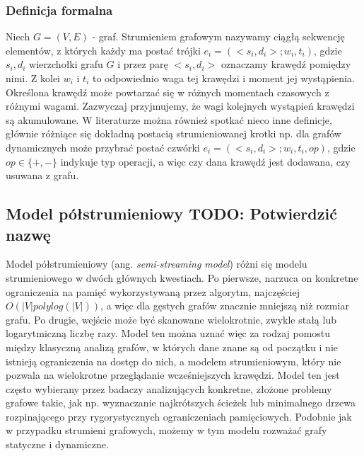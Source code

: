         \subsubsection*{Definicja formalna}
            Niech $G = (V,E)$ - graf. Strumieniem grafowym nazywamy ciągłą sekwencję elementów, z których każdy ma postać trójki $e_i = (<s_i, d_i>; w_i, t_i)$, gdzie $s_i, d_i$ wierzchołki grafu $G$ i przez parę $<s_i, d_i>$ oznaczamy krawędź pomiędzy nimi. Z kolei $w_i$ i $t_i$ to odpowiednio waga tej krawędzi i moment jej wystąpienia. Określona krawędź może powtarzać się w różnych momentach czasowych z różnymi wagami. Zazwyczaj przyjmujemy, że wagi kolejnych wystąpień krawędzi są akumulowane. W literaturze można również spotkać nieco inne definicje, głównie różniące się dokładną postacią strumieniowanej krotki np. dla grafów dynamicznych może przybrać postać czwórki $e_i = (<s_i, d_i>; w_i, t_i, op)$, gdzie $op \in \{+, -\}$ indykuje typ operacji, a więc czy dana krawędź jest dodawana, czy usuwana z grafu\cite{Pacaci_Bonifati_Özsu_2020}.    
        
        

    \subsection{Model półstrumieniowy TODO: Potwierdzić nazwę}
        Model półstrumieniowy\cite{Feigenbaum_Kannan_McGregor_Suri_Zhang_2005} (ang. \emph{semi-streaming model}) różni się modelu strumieniowego w dwóch głównych kwestiach. Po pierwsze, narzuca on konkretne ograniczenia na pamięć wykorzystywaną przez algorytm, najczęściej $O(|V| polylog(|V|))$, a więc dla gęstych grafów znacznie mniejszą niż rozmiar grafu. Po drugie, wejście może być skanowane wielokrotnie, zwykle stałą lub logarytmiczną liczbę razy. Model ten można uznać więc za rodzaj pomostu między klasyczną analizą grafów, w których dane znane są od początku i nie istnieją ograniczenia na dostęp do nich, a modelem strumieniowym, który nie pozwala na wielokrotne przeglądanie wcześniejszych krawędzi. Model ten jest często wybierany przez badaczy analizujących konkretne, złożone problemy grafowe takie, jak np.  wyznaczanie najkrótszych ścieżek \cite{Elkin_Trehan_2022} lub minimalnego drzewa rozpinającego \cite{Ahn_Guha_McGregor_2012} przy rygorystycznych ograniczeniach pamięciowych. Podobnie jak w przypadku strumieni grafowych, możemy w tym modelu rozważać grafy statyczne i dynamiczne.

